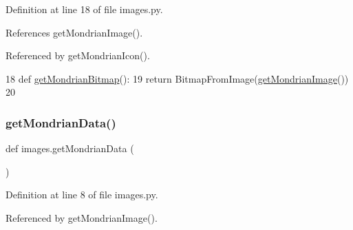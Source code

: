Definition at line 18 of file images.\+py.



References get\+Mondrian\+Image().



Referenced by get\+Mondrian\+Icon().


\begin{DoxyCode}
18 \textcolor{keyword}{def }\hyperlink{namespaceimages_a3ae00d30a729f478de891d5d97fb7608}{getMondrianBitmap}():
19     \textcolor{keywordflow}{return} BitmapFromImage(\hyperlink{namespaceimages_a02fd56f1e295f6d744c8e3ce0a34fdb9}{getMondrianImage}())
20 
\end{DoxyCode}
\mbox{\label{namespaceimages_aecec2b84a11430cc4d1eac8aa019d74a}} 
\subsubsection{\texorpdfstring{get\+Mondrian\+Data()}{getMondrianData()}}
{\footnotesize\ttfamily def images.\+get\+Mondrian\+Data (\begin{DoxyParamCaption}{ }\end{DoxyParamCaption})}



Definition at line 8 of file images.\+py.



Referenced by get\+Mondrian\+Image().


